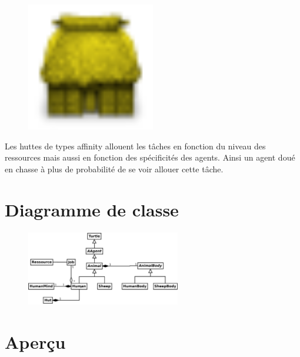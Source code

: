 \begin{minipage}[H]{0.1\linewidth}
  \begin{figure}[H]
    \begin{center}
      \includegraphics[width=0.5\textwidth]{./img/hut_affinity}
    \end{center}
  \end{figure}
\end{minipage}
\begin{minipage}[H]{0.9\linewidth}
  Les huttes de types \og{}affinity\fg{} allouent les tâches en
  fonction du niveau des ressources mais aussi en fonction des
  spécificités des agents. Ainsi un agent doué en chasse à plus de
  probabilité de se voir allouer cette tâche.
\end{minipage}

\section{Diagramme de classe}
  \begin{figure}[H]
    \begin{center}
      \includegraphics[width=0.6\textwidth]{./diags/uml}
    \end{center}
  \end{figure}
\section{Aperçu}

